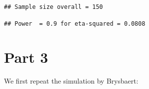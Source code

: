 \documentclass[]{book}
\newenvironment{Shaded}{\begin{snugshade}}{\end{snugshade}}
\newcommand{\CommentTok}[1]{\textcolor[rgb]{0.56,0.35,0.01}{\textit{#1}}}
\begin{document}
\begin{verbatim}
## Sample size overall = 150
\end{verbatim}

\begin{verbatim}
## Power  = 0.9 for eta-squared = 0.0808
\end{verbatim}

\begin{Shaded}
\end{Shaded}

\hypertarget{part-3}{%
\section{Part 3}\label{part-3}}

We first repeat the simulation by Brysbaert:
\end{document}
